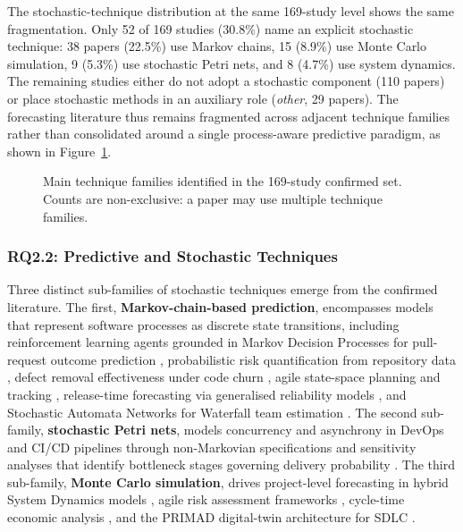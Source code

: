 The stochastic-technique distribution at the same 169-study level shows the
same fragmentation. Only 52 of 169 studies (30.8\%) name an explicit
stochastic technique: 38 papers (22.5\%) use Markov chains, 15 (8.9\%) use
Monte Carlo simulation, 9 (5.3\%) use stochastic Petri nets, and 8 (4.7\%)
use system dynamics. The remaining studies either do not adopt a stochastic
component (110 papers) or place stochastic methods in an auxiliary role
(\textit{other}, 29 papers). The forecasting literature thus remains
fragmented across adjacent technique families rather than consolidated around
a single process-aware predictive paradigm, as shown in
Figure~\ref{fig:pdf-technique-dist}.

\begin{figure}[tbp]
\centering
{}
\caption{Main technique families identified in the 169-study confirmed set.
Counts are non-exclusive: a paper may use multiple technique families.}
\label{fig:pdf-technique-dist}
\end{figure}

\subsubsection{RQ2.2: Predictive and Stochastic Techniques}

Three distinct sub-families of stochastic techniques emerge from the confirmed
literature. The first, \textbf{Markov-chain-based prediction}, encompasses
models that represent software processes as discrete state transitions, including
reinforcement learning agents grounded in Markov Decision Processes for
pull-request outcome prediction \cite{joshi2024}, probabilistic risk
quantification from repository data \cite{jeon2015}, defect removal
effectiveness under code churn \cite{tian2005}, agile state-space planning and
tracking \cite{tyagi2021}, release-time forecasting via generalised reliability
models \cite{washizaki2015}, and Stochastic Automata Networks for Waterfall team
estimation \cite{massitela2018}. The second sub-family, \textbf{stochastic
Petri nets}, models concurrency and asynchrony in DevOps and CI/CD pipelines
through non-Markovian specifications \cite{benmesmia2021} and sensitivity
analyses that identify bottleneck stages governing delivery probability
\cite{bhadra2022,bhadra2023}. The third sub-family, \textbf{Monte Carlo
simulation}, drives project-level forecasting in hybrid System Dynamics models
\cite{li2020}, agile risk assessment frameworks \cite{lunesu2021}, cycle-time
economic analysis \cite{magennis2015}, and the PRIMAD digital-twin architecture
for SDLC \cite{guinea2025}.

